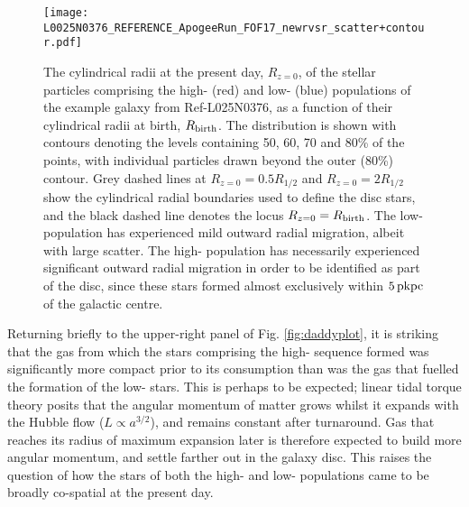 \begin{figure}
\texttt{[image: L0025N0376\_REFERENCE\_ApogeeRun\_FOF17\_newrvsr\_scatter+contour.pdf]}
\caption[The change in cylindrical radius since birth of disc stars in the example galaxy from Ref-L025N376]{\label{fig:birth_vs_z0_radii} The cylindrical radii at the present day, $R_{z=0}$, of the stellar particles comprising the high- (red) and low-\afe{} (blue) populations of the example galaxy from Ref-L025N0376, as a function of their cylindrical radii at birth, $R_{\rm birth}$. The distribution is shown with contours denoting the levels containing 50, 60, 70 and 80\% of the points, with individual particles drawn beyond the outer (80\%) contour. Grey dashed lines at $R_{z=0} = 0.5R_{1/2}$ and $R_{z=0} = 2R_{1/2}$ show the cylindrical radial boundaries used to define the disc stars, and the black dashed line denotes the locus $R_{z=0} = R_{\rm birth}$. The low-\afe{} population has experienced mild outward radial migration, albeit with large scatter. The high-\afe{} population has necessarily experienced significant outward radial migration in order to be identified as part of the disc, since these stars formed almost exclusively within $5\,{\rm pkpc}$ of the galactic centre.}
\end{figure}

Returning briefly to the upper-right panel of Fig. \ref{fig:daddyplot}, it is striking that the gas from which the stars comprising the high-\afe{} sequence formed was significantly more compact prior to its consumption than was the gas that fuelled the formation of the low-\afe{} stars. This is perhaps to be expected; linear tidal torque theory \citep{1984ApJ...286...38W,1996MNRAS.282..455C} posits that the angular momentum of matter grows whilst it expands with the Hubble flow ($L \propto a^{3/2}$), and remains constant after turnaround. Gas that reaches its radius of maximum expansion later is therefore expected to build more angular momentum, and settle farther out in the galaxy disc. This raises the question of how the stars of both the high- and low-\afe{} populations came to be broadly co-spatial at the present day. 

